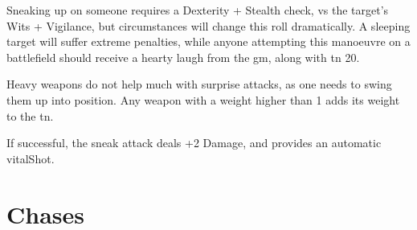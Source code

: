 \begin{multicols}{2}
Sneaking up on someone requires a Dexterity + Stealth check, vs the target's Wits + Vigilance, but circumstances will change this roll dramatically.
A sleeping target will suffer extreme penalties, while anyone attempting this manoeuvre on a battlefield should receive a hearty laugh from the \gls{gm}, along with \gls{tn} 20.

Heavy weapons do not help much with surprise attacks, as one needs to swing them up into position.
Any weapon with a \gls{weight} higher than 1 adds its \gls{weight} to the \gls{tn}.

If successful, the sneak attack deals +2 Damage, and provides an automatic \gls{vitalShot}.

\stopcontents[Manoeuvres]

\end{multicols}

\section{Chases}
\label{chases}

\chasechart

